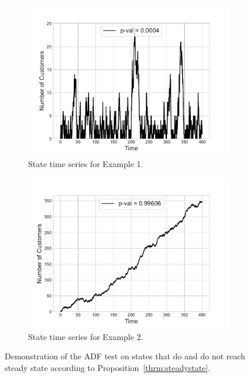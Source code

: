 \documentclass{article}
\begin{document}
\begin{figure}
  \begin{center}
  \begin{subfigure}[b]{0.45\textwidth}
    \includegraphics[width=\textwidth]{img/adf_test_steadystate.pdf}
    \caption{State time series for Example 1.}
    \label{fig:timeseries1}
  \end{subfigure}
  \begin{subfigure}[b]{0.45\textwidth}
    \includegraphics[width=\textwidth]{img/adf_test_not_steadystate.pdf}
    \caption{State time series for Example 2.}
    \label{fig:timeseries2}
  \end{subfigure}
  \caption{Demonstration of the ADF test on states that do and do not reach
  steady state according to Proposition~\ref{thrm:steadystate}.}
  \end{center}
\end{figure}
\end{document}
